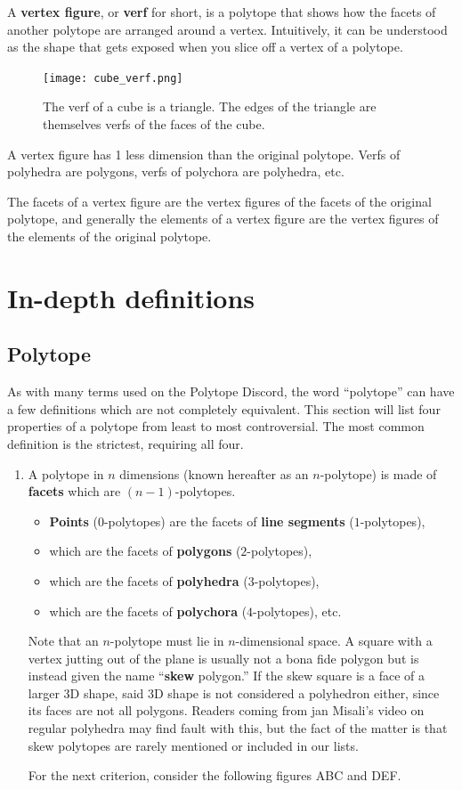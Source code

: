 \documentclass{article}
\begin{document}
A \textbf{vertex figure}, or \textbf{verf} for short, is a polytope that shows how
the facets of another polytope are arranged around a vertex. Intuitively, it can
be understood as the shape that gets exposed when you slice off a vertex of a polytope.

\begin{figure}[H]
  \centering
  \texttt{[image: cube\_verf.png]}
  \caption{The verf of a cube is a triangle. The edges of the triangle are
  themselves verfs of the faces of the cube.}
\end{figure}

A vertex figure has 1 less dimension than the original polytope. Verfs of polyhedra are
polygons, verfs of polychora are polyhedra, etc.

The facets of a vertex figure are the vertex figures of the facets of the original polytope,
and generally the elements of a vertex figure are the vertex figures of the elements of the
original polytope.

\section{In-depth definitions}
\label{indepth}

\subsection{Polytope}

As with many terms used on the Polytope Discord,
the word ``polytope'' can have a few definitions which are not completely equivalent.
This section will list four properties of a polytope from least to most controversial.
The most common definition is the strictest, requiring all four.
\begin{enumerate}
  \item
A polytope in $n$ dimensions (known hereafter as an $n$-polytope)
is made of \textbf{facets} which are $(n-1)$-polytopes.
\begin{itemize}
  \item \textbf{Points} ($0$-polytopes) are the facets of \textbf{line segments} ($1$-polytopes),
  \item which are the facets of \textbf{polygons} ($2$-polytopes),
  \item which are the facets of \textbf{polyhedra} ($3$-polytopes),
  \item which are the facets of \textbf{polychora} ($4$-polytopes), etc.
\end{itemize}

Note that an $n$-polytope must lie in $n$-dimensional space.
A square with a vertex jutting out of the plane is usually not a bona fide polygon
but is instead given the name ``\textbf{skew} polygon.''
If the skew square is a face of a larger 3D shape,
said 3D shape is not considered a polyhedron either,
since its faces are not all polygons.
Readers coming from jan Misali's video on regular polyhedra may find fault with this,
but the fact of the matter is that
skew polytopes are rarely mentioned or included in our lists.

For the next criterion, consider the following figures ABC and DEF.
\end{enumerate}
\end{document}
